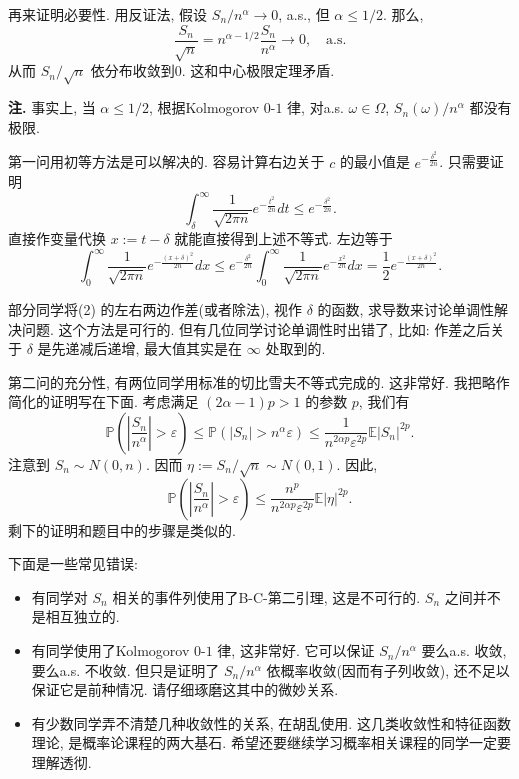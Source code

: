 \begin{enumerate}
\begin{proofc}
\begin{enumerate}[label=(\arabic*)]
再来证明必要性. 用反证法, 假设 $S_{n} / n^{\alpha} \to 0$, a.s., 但 $\alpha \leq1 / 2$. 那么,
\[
\frac{S_{n}}{\sqrt{n}}=n^{\alpha-1 / 2} \frac{S_{n}}{n^{\alpha}} \to 0, \quad \text{a.s.}
\]
从而 $S_{n} / \sqrt{n}$ 依分布收敛到$0$. 这和中心极限定理矛盾.
\end{enumerate}

\textbf{注.} 事实上, 当 $\alpha \leq1 / 2$, 根据Kolmogorov $0$-$1$ 律, 对a.s. $\omega \in \Omega$, $S_{n}(\omega) / n^{\alpha}$ 都没有极限.

第一问用初等方法是可以解决的. 容易计算右边关于 $c$ 的最小值是 $e^{-\frac{\delta^{2}}{2 n}}$. 只需要证明
\[
\int_{\delta}^{\infty} \frac{1}{\sqrt{2 \pi n}} e^{-\frac{t^{2}}{2 n}} d t \leq e^{-\frac{\delta^{2}}{2 n}} .
\]
直接作变量代换 $x:=t-\delta$ 就能直接得到上述不等式. 左边等于
\[
\int _{0}^{\infty }\frac {1}{\sqrt {2\pi n}}e^{-\frac {(x+\delta )^{2}}{2n}}dx\leq e^{-\frac {\delta ^{2}}{2n}}\int _{0}^{\infty }\frac {1}{\sqrt {2\pi n}}e^{-\frac {x^{2}}{2n}}dx=\frac {1}{2}e^{-\frac {(x+\delta) ^{2}}{2n}}.
\]

部分同学将(2) 的左右两边作差(或者除法), 视作 $\delta$ 的函数, 求导数来讨论单调性解决问题. 这个方法是可行的. 但有几位同学讨论单调性时出错了, 比如: 作差之后关于 $\delta$ 是先递减后递增, 最大值其实是在 $\infty$ 处取到的.

第二问的充分性, 有两位同学用标准的切比雪夫不等式完成的. 这非常好. 我把略作简化的证明写在下面. 考虑满足 $(2 \alpha-1) p>1$ 的参数 $p$, 我们有
\[
\mathbb{P}\left( \left| \frac {S_{n}}{n^{\alpha }}\right| >\varepsilon \right) \leq \mathbb{P}(|S_{n}|>n^{\alpha }\varepsilon )\leq \frac {1}{n^{2\alpha p}\varepsilon ^{2p}}\mathbb{E}|S_{n}|^{2p}.
\]
注意到 $S_{n} \sim N(0, n)$. 因而 $\eta:=S_{n} / \sqrt{n} \sim N(0,1)$. 因此,
\[
\mathbb{P}\left(\left|\frac{S_{n}}{n^{\alpha}}\right|>\varepsilon\right) \leq \frac{n^{p}}{n^{2 \alpha p} \varepsilon^{2 p}} \mathbb{E}|\eta|^{2 p} .
\]
剩下的证明和题目中的步骤是类似的.

下面是一些常见错误:
\begin{itemize}
\item 有同学对 $S_{n}$ 相关的事件列使用了B-C-第二引理, 这是不可行的. $S_{n}$ 之间并不是相互独立的.
\item 有同学使用了Kolmogorov $0$-$1$ 律, 这非常好. 它可以保证 $S_{n} / n^{\alpha}$ 要么a.s. 收敛, 要么a.s. 不收敛. 但只是证明了 $S_{n} / n^{\alpha}$ 依概率收敛(因而有子列收敛), 还不足以保证它是前种情况. 请仔细琢磨这其中的微妙关系.
\item 有少数同学弄不清楚几种收敛性的关系, 在胡乱使用. 这几类收敛性和特征函数理论, 是概率论课程的两大基石. 希望还要继续学习概率相关课程的同学一定要理解透彻.\qedhere
\end{itemize}
\end{proofc}


\end{enumerate}
